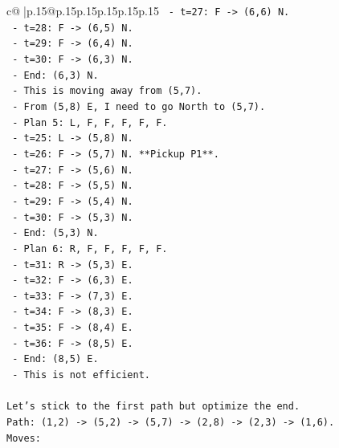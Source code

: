 \documentclass{article}
\begin{document}
{\begin{supertabular}{c@{$\;$}|p{.15\linewidth}@{}p{.15\linewidth}p{.15\linewidth}p{.15\linewidth}p{.15\linewidth}p{.15\linewidth}}
{{{\texttt{                  {-} t=27: F {-}> (6,6) N.} \\
\texttt{                  {-} t=28: F {-}> (6,5) N.} \\
\texttt{                  {-} t=29: F {-}> (6,4) N.} \\
\texttt{                  {-} t=30: F {-}> (6,3) N.} \\
\texttt{                  {-} End: (6,3) N.} \\
\texttt{                {-} This is moving away from (5,7).} \\
\texttt{                {-} From (5,8) E, I need to go North to (5,7).} \\
\texttt{                {-} Plan 5: L, F, F, F, F, F.} \\
\texttt{                  {-} t=25: L {-}> (5,8) N.} \\
\texttt{                  {-} t=26: F {-}> (5,7) N. **Pickup P1**.} \\
\texttt{                  {-} t=27: F {-}> (5,6) N.} \\
\texttt{                  {-} t=28: F {-}> (5,5) N.} \\
\texttt{                  {-} t=29: F {-}> (5,4) N.} \\
\texttt{                  {-} t=30: F {-}> (5,3) N.} \\
\texttt{                  {-} End: (5,3) N.} \\
\texttt{                {-} Plan 6: R, F, F, F, F, F.} \\
\texttt{                  {-} t=31: R {-}> (5,3) E.} \\
\texttt{                  {-} t=32: F {-}> (6,3) E.} \\
\texttt{                  {-} t=33: F {-}> (7,3) E.} \\
\texttt{                  {-} t=34: F {-}> (8,3) E.} \\
\texttt{                  {-} t=35: F {-}> (8,4) E.} \\
\texttt{                  {-} t=36: F {-}> (8,5) E.} \\
\texttt{                  {-} End: (8,5) E.} \\
\texttt{                {-} This is not efficient.} \\
\\ 
\texttt{Let's stick to the first path but optimize the end.} \\
\texttt{Path: (1,2) {-}> (5,2) {-}> (5,7) {-}> (2,8) {-}> (2,3) {-}> (1,6).} \\
\texttt{Moves:} \\
}}}
\end{supertabular}}
\end{document}
